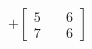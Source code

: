 \documentclass[preview]{standalone}
\begin{document}
\begin{align*}
+\begin{bmatrix} 5 & \quad 6 \\ 7 & \quad 6 \end{bmatrix}
\end{align*}
\end{document}
